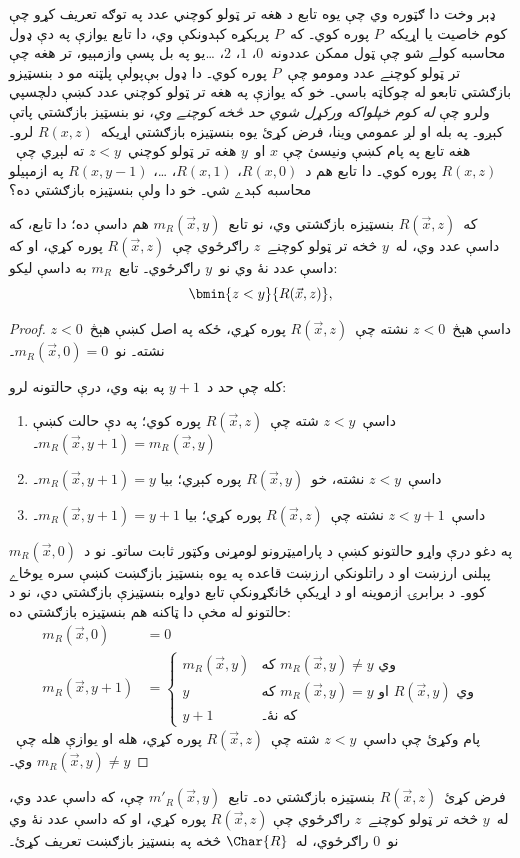 \documentclass[../../../include/open-logic-section]{subfiles}
\begin{document}

\begin{explain}
ډېر وخت دا ګټوره وي چې يوه تابع د هغه تر ټولو کوچني عدد په توګه تعريف کړو چې کوم خاصيت يا اړيکه~$P$ پوره کوي۔ که~$P$ پرېکړه کېدونکې وي، دا تابع يوازې په دې ډول محاسبه کولے شو چې ټول ممکن عددونه~$0$، $1$، $2$، \dots يو په بل پسې وازمېيو، تر هغه چې تر ټولو کوچنے عدد ومومو چې~$P$ پوره کوي۔ دا ډول بې‌پولې پلټنه مو د بنسټيزو بازګشتي تابعو له چوکاټه باسي۔ خو که يوازې په هغه تر ټولو کوچني عدد کښې دلچسپي ولرو چې
\emph{له کوم خپلواکه ورکړل شوي حد څخه کوچنے وي}، نو بنسټيز بازګشتي پاتې کېږو۔ په بله او لږ عمومي وينا، فرض کړئ يوه بنسټيزه بازګشتي اړيکه~$R(x,z)$ لرو۔ هغه تابع په پام کښې ونيسئ چې $x$ او~$y$ هغه تر ټولو کوچني~$z < y$ ته لېږي چې~$R(x, z)$ پوره کوي۔ دا تابع هم د~$R(x, 0)$، $R(x, 1)$، \dots، $R(x, y-1)$ په ازمېيلو محاسبه کېدے شي۔ خو دا ولې بنسټيزه بازګشتي ده؟
\end{explain}

\begin{prop}
که~$R(\vec x, z)$ بنسټيزه بازګشتي وي، نو تابع~$m_R(\vec{x}, y)$ هم داسې ده؛ دا تابع، که داسې عدد وي، له~$y$ څخه تر ټولو کوچنے~$z$ راګرځوي چې~$R(\vec x, z)$ پوره کړي، او که داسې عدد نۀ وي نو~$y$ راګرځوي۔ تابع~$m_R$ به داسې ليکو:
\[
\bmin{z < y}{R(\vec{x}, z)},
\]
\end{prop}

\begin{proof}
داسې هېڅ~$z < 0$ نشته چې~$R(\vec{x}, z)$ پوره کړي، ځکه په اصل کښې هېڅ~$z < 0$ نشته۔ نو~$m_R(\vec x, 0) = 0$۔

کله چې حد د~$y + 1$ په بڼه وي، درې حالتونه لرو:
\begin{enumerate}
\item داسې~$z < y$ شته چې~$R(\vec{x}, z)$ پوره کوي؛ په دې حالت کښې $m_R(\vec{x}, y+1) = m_R(\vec{x}, y)$۔
\item داسې~$z<y$ نشته، خو~$R(\vec{x}, y)$ پوره کېږي؛ بيا $m_R(\vec{x}, y+1) = y$۔
\item داسې~$z < y+1$ نشته چې~$R(\vec{x}, z)$ پوره کړي؛ بيا $m_R(\vec{x}, y+1) = y+1$۔
\end{enumerate}
په دغو درې واړو حالتونو کښې د پاراميټرونو لومړنی وکټور ثابت ساتو۔
نو د~$m_R(\vec x, 0)$ پېلنی ارزښت او د راتلونکي ارزښت قاعده په يوه بنسټيز بازګښت کښې سره يوځاے کوو۔ د برابرۍ ازموينه او د اړيکې ځانګړونکې تابع دواړه بنسټيزې بازګشتي دي، نو د حالتونو له مخې دا ټاکنه هم بنسټيزه بازګشتي ده:
\begin{align*}
m_R(\vec{x}, 0) & = 0\\
m_R(\vec{x}, y+1) & =
\begin{cases}
m_R(\vec{x}, y) & \text{که $m_R(\vec x, y) \neq y$ وي}\\
y & \text{که $m_R(\vec x, y) = y$ او $R(\vec{x}, y)$ وي}\\
y+1 & \text{که نۀ۔}
\end{cases}
\end{align*}
پام وکړئ چې داسې~$z<y$ شته چې~$R(\vec x, z)$ پوره کړي، هله او يوازې هله چې~$m_R(\vec x, y) \neq y$ وي۔
\end{proof}

\begin{prob}
فرض کړئ~$R(\vec x, z)$ بنسټيزه بازګشتي ده۔ تابع~$m'_R(\vec{x}, y)$ چې، که داسې عدد وي، له~$y$ څخه تر ټولو کوچنے~$z$ راګرځوي چې $R(\vec{x}, z)$ پوره کړي، او که داسې عدد نۀ وي نو~$0$ راګرځوي، له~$\Char{R}$ څخه په بنسټيز بازګښت تعريف کړئ۔
\end{prob}
\end{document}
